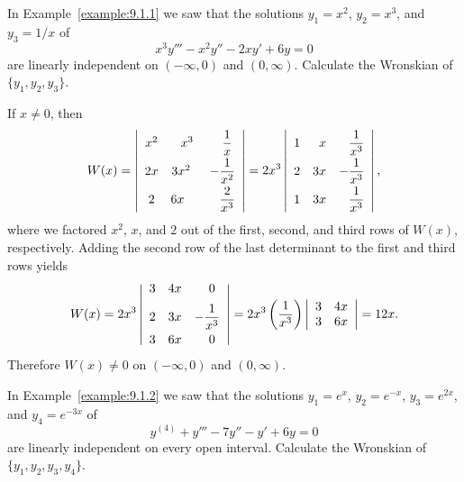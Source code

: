 \begin{example}
  \label{example:9.1.3} \rm In Example~\ref{example:9.1.1} we saw that the solutions $y_{1}=x^{2}$,
  $y_{2}=x^{3}$, and $y_{3}=1/x$ of
  \[
    x^{3}y'''-x^{2}y''-2xy'+6y=0
  \]
  are linearly independent on $(-\infty,0)$ and $(0,\infty)$. Calculate the Wronskian of
  $\{y_{1},y_{2},y_{3}\}$.
\end{example}

\begin{examplesolution}
\solution If $x\ne0$, then
\[
  W(x)=\left|
  \begin{array}{ccc}
    x^{2} & \phantom{2}x^{3}     & \phantom{-}\dst\frac{1}{x}     \\[2\jot]
    2x    & 3x^{2}\phantom{^{2}} & \dst-\dst\frac{1}{x^{2}}       \\[2\jot]
    2     & 6x\phantom{x^{2}}    & \phantom{-}\dst\frac{2}{x^{3}}
  \end{array}
  \right| =2x^{3}\left|
  \begin{array}{ccc}
    1 & \phantom{3}x & \phantom{-}\dst\frac{1}{x^{3}} \\[2\jot]
    2 & 3x           & -\dst\frac{1}{x^{3}}           \\[2\jot]
    1 & 3x           & \phantom{-}\dst\frac{1}{x^{3}}
  \end{array}\right|,
\]
where we factored $x^{2}$, $x$, and $2$ out of the first, second, and third rows of $W(x)$,
respectively. Adding the second row of the last determinant to the first and third rows yields
\[
  W(x)=2x^{3}\left|
  \begin{array}{ccc}
    3 & 4x & \phantom{-}0         \\[2\jot]
    2 & 3x & -\displaystyle\frac{1}{x^{3}} \\[2\jot]
    3 & 6x & \phantom{-}0
  \end{array}\right| =2x^{3}\left(\frac{1}{x^{3}}\right)\left|
  \begin{array}{cc}
    3 & 4x \\
    3 & 6x
  \end{array}\right|=12x.
\]
Therefore $W(x)\ne0$ on $(-\infty,0)$ and $(0,\infty)$.
\end{examplesolution}

\begin{example}
  \label{example:9.1.4} \rm In Example~\ref{example:9.1.2} we saw that the solutions $y_{1}=e^{x}$,
  $y_{2}=e^{-x}$, $y_{3}=e^{2x}$, and $y_{4}=e^{-3x}$ of
  \[
    y^{(4)}+y'''-7y''-y'+6y=0
  \]
  are linearly independent on every open interval. Calculate the Wronskian of
  $\{y_{1},y_{2},y_{3},y_{4}\}$.
\end{example}

